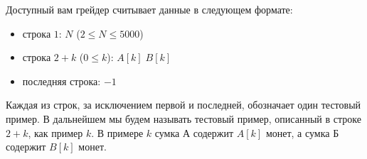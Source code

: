 Доступный вам грейдер считывает данные в следующем формате:

\begin{itemize}
    \item строка $1$: $N$ ($2 \le N \le 5000$)
    \item строка $2 + k$ ($0 \le k$): $A[k] \; B[k]$
    \item последняя строка: $-1$
\end{itemize}

Каждая из строк, за исключением первой и последней, обозначает один тестовый пример. В дальнейшем мы будем называть тестовый пример, описанный в строке $2 + k$, как пример $k$.
В примере $k$ сумка А содержит $A[k]$ монет, а сумка Б содержит $B[k]$ монет.
